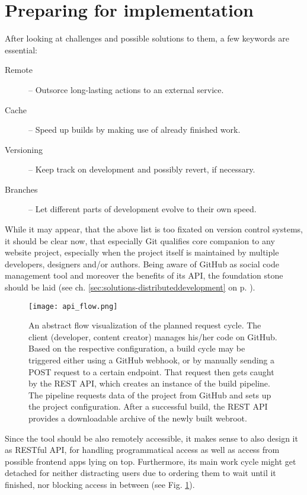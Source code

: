 \section{Preparing for implementation}
\label{sec:primarythoughts}

After looking at challenges and possible solutions to them, a few keywords are essential:

\begin{description}
  \item[Remote] -- Outsorce long-lasting actions to an external service.
  \item[Cache] -- Speed up builds by making use of already finished work.
  \item[Versioning] -- Keep track on development and possibly revert, if necessary.
  \item[Branches] -- Let different parts of development evolve to their own speed.
\end{description}

While it may appear, that the above list is too fixated on version control systems, it should be clear now, that especially Git qualifies core companion to any website project, especially when the project itself is maintained by multiple developers, designers and/or authors. Being aware of GitHub as social code management tool and moreover the benefits of its API, the foundation stone should be laid (see ch. \ref{sec:solutions-distributeddevelopment} on p. \pageref{sec:solutions-distributeddevelopment}).

\begin{figure} %
    \centering
    \texttt{[image: api\_flow.png]}
    \caption{An abstract flow visualization of the planned request cycle. The client (developer, content creator) manages his/her code on GitHub. Based on the respective configuration, a build cycle may be triggered either using a GitHub webhook, or by manually sending a POST request to a certain endpoint.    That request then gets caught by the REST API, which creates an instance of the build pipeline. The pipeline requests data of the project from GitHub and sets up the project configuration. After a successful build, the REST API provides a downloadable archive of the newly built webroot.}
    \label{fig:api-flow}
\end{figure}
%

Since the tool should be also remotely accessible, it makes sense to also design it as RESTful API, for handling programmatical access as well as access from possible frontend apps lying on top. Furthermore, its main work cycle might get detached for neither distracting users due to ordering them to wait until it finished, nor blocking access in between (see Fig. \ref{fig:api-flow}).


